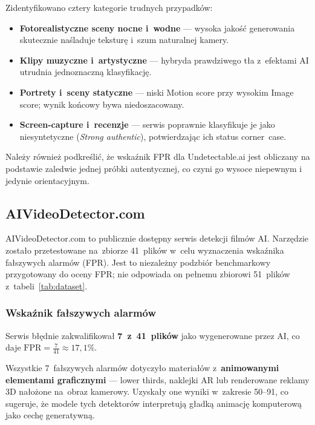 Zidentyfikowano cztery kategorie trudnych przypadk\'{o}w:
\begin{itemize}
  \item \textbf{Fotorealistyczne sceny nocne i~wodne} ---
        wysoka jako\'{s}\'{c} generowania skutecznie na\'{s}laduje
        tekstur\k{e} i~szum naturalnej kamery.
  \item \textbf{Klipy muzyczne i~artystyczne} ---
        hybryda prawdziwego t\l{}a z~efektami AI utrudnia
        jednoznaczn\k{a} klasyfikacj\k{e}.
  \item \textbf{Portrety i~sceny statyczne} ---
        niski Motion score przy wysokim Image score;
        wynik ko\'{n}cowy bywa niedoszacowany.
  \item \textbf{Screen-capture i~recenzje} ---
        serwis poprawnie klasyfikuje je jako niesyntetyczne
        (\emph{Strong authentic}), potwierdzaj\k{a}c ich status corner~case.
\end{itemize}

Należy również podkreślić, że wskaźnik FPR dla Undetectable.ai jest obliczany
na podstawie zaledwie jednej próbki autentycznej, co czyni go wysoce niepewnym
i jedynie orientacyjnym.

\subsection{AIVideoDetector.com}
\label{sec:aivideodetector}

AIVideoDetector.com to publicznie dost\k{e}pny serwis detekcji film\'{o}w AI.
Narz\k{e}dzie zosta\l{}o przetestowane na~zbiorze 41~plik\'{o}w
w~celu wyznaczenia wska\'{z}nika fa\l{}szywych alarm\'{o}w (FPR).
Jest to niezależny podzbiór benchmarkowy przygotowany do oceny FPR;
nie odpowiada on pełnemu zbiorowi 51~plików z~tabeli~\ref{tab:dataset}.

\subsubsection{Wska\'{z}nik fa\l{}szywych alarm\'{o}w}

Serwis b\l{}\k{e}dnie zakwalifikowa\l{} \textbf{7~z~41~plik\'{o}w}
jako wygenerowane przez AI, co daje
$\mathrm{FPR} = \frac{7}{41} \approx 17{,}1\%$.

Wszystkie 7~fa\l{}szywych alarm\'{o}w dotyczy\l{}o materia\l{}\'{o}w
z~\textbf{animowanymi elementami graficznymi} --- lower thirds,
naklejki AR lub renderowane reklamy 3D na\l{}o\.{z}one na~obraz kamerowy.
Uzyska\l{}y one wyniki w~zakresie 50--91, co sugeruje,
\.{z}e modele tych detektor\'{o}w interpretuj\k{a} g\l{}adk\k{a} animacj\k{e}
komputerow\k{a} jako cech\k{e} generatywn\k{a}.

